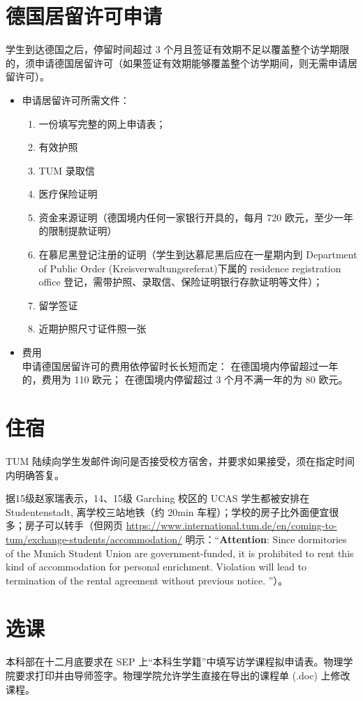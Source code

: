 \documentclass{article}
\begin{document}
\section{德国居留许可申请}
学生到达德国之后，停留时间超过 3 个月且签证有效期不足以覆盖整个访学期限的，须申请德国居留许可（如果签证有效期能够覆盖整个访学期间，则无需申请居留许可）。
\begin{itemize}
\item 申请居留许可所需文件：
\begin{enumerate}
\item 一份填写完整的网上申请表；
\item 有效护照
\item TUM 录取信
\item 医疗保险证明
\item 资金来源证明（德国境内任何一家银行开具的，每月 720 欧元，至少一年的限制提款证明）
\item 在慕尼黑登记注册的证明（学生到达慕尼黑后应在一星期内到 Department of Public Order (Kreisverwaltungsreferat)下属的 residence registration office 登记，需带护照、录取信、保险证明银行存款证明等文件）；
\item 留学签证
\item 近期护照尺寸证件照一张
\end{enumerate}
\item 费用\\
申请德国居留许可的费用依停留时长长短而定：
在德国境内停留超过一年的，费用为 110 欧元；
在德国境内停留超过 3 个月不满一年的为 80 欧元。
\end{itemize}

\section{住宿}
TUM 陆续向学生发邮件询问是否接受校方宿舍，并要求如果接受，须在指定时间内明确答复。

据15级赵家瑞表示，14、15级 Garching 校区的 UCAS 学生都被安排在 Studentenstadt, 离学校三站地铁（约 20min 车程）；学校的房子比外面便宜很多；房子可以转手（但网页 \url{https://www.international.tum.de/en/coming-to-tum/exchange-students/accommodation/} 明示：``\textbf{Attention}: Since dormitories of the Munich Student Union are government-funded, it is prohibited to rent this kind of accommodation for personal enrichment. Violation will lead to termination of the rental agreement without previous notice. ''）。

\section{选课}
本科部在十二月底要求在 SEP 上“本科生学籍”中填写访学课程拟申请表。物理学院要求打印并由导师签字。物理学院允许学生直接在导出的课程单 (.doc) 上修改课程。
\end{document}
